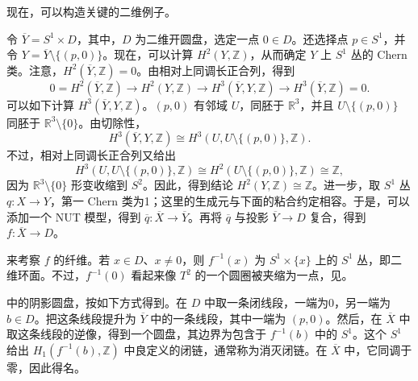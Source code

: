 现在，可以构造关键的二维例子。

\begin{construction}\label{constr:6.86}
令 $\overline Y=S^1\times D$，其中，$D$ 为二维开圆盘，选定一点 $0\in D$。还选择点 $p\in S^1$，并令 $Y=\overline Y\setminus\{(p,0)\}$。现在，可以计算 $H^2(Y,\mathbb Z)$，从而确定 $Y$ 上 $S^1$ 丛的 Chern 类。注意，$H^2(\overline Y,\mathbb Z)=0$。由相对上同调长正合列，得到
\[
0=H^2(\overline Y,\mathbb Z)\longrightarrow H^2(Y,\mathbb Z)
\longrightarrow H^3(\overline Y,Y,\mathbb Z)
\longrightarrow H^3(\overline Y,\mathbb Z)=0.
\]
可以如下计算 $H^3(\overline Y,Y,\mathbb Z)$。$(p,0)$ 有邻域 $U$，同胚于 $\mathbb R^3$，并且 $U\setminus\{(p,0)\}$ 同胚于 $\mathbb R^3\setminus\{0\}$。由切除性，
\[
H^3(\overline Y,Y,\mathbb Z)\cong H^3(U,U\setminus\{(p,0)\},\mathbb Z).
\]
不过，相对上同调长正合列又给出
\[
H^3(U,U\setminus\{(p,0)\},\mathbb Z)
\cong H^2(U\setminus\{(p,0)\},\mathbb Z)\cong\mathbb Z,
\]
因为 $\mathbb R^3\setminus\{0\}$ 形变收缩到 $S^2$。因此，得到结论 $H^2(Y,\mathbb Z)\cong\mathbb Z$。进一步，取 $S^1$ 丛 $q\colon X\to Y$，第一 Chern 类为1；这里的生成元与下面的粘合约定相容。于是，可以添加一个 NUT 模型，得到 $\overline q\colon\overline X\to\overline Y$。再将 $\overline q$ 与投影 $\overline Y\to D$ 复合，得到 $f\colon\overline X\to D$。

来考察 $f$ 的纤维。若 $x\in D$、$x\ne0$，则 $f^{-1}(x)$ 为 $S^1\times\{x\}$ 上的 $S^1$ 丛，即二维环面。不过，$f^{-1}(0)$ 看起来像 $T^2$ 的一个圆圈被夹缩为一点，见。
\begin{figure}[H]
\centering
{}
\BookNumberOnlyCaption\label{fig:6.5}
\end{figure}
中的阴影圆盘，按如下方式得到。在 $D$ 中取一条闭线段，一端为0，另一端为 $b\in D$。把这条线段提升为 $\overline Y$ 中的一条线段，其中一端为 $(p,0)$。然后，在 $\overline X$ 中取这条线段的逆像，得到一个圆盘，其边界为包含于 $f^{-1}(b)$ 中的 $S^1$。这个 $S^1$ 给出 $H_1(f^{-1}(b),\mathbb Z)$ 中良定义的闭链，通常称为消灭闭链。在 $\overline X$ 中，它同调于零，因此得名。


\end{construction}
